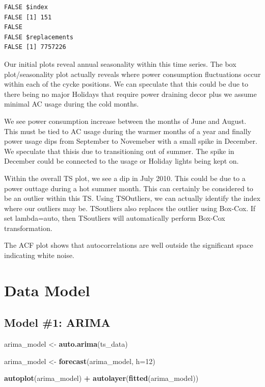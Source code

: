 \documentclass[openany]{book}
\newenvironment{Shaded}{\begin{snugshade}}{\end{snugshade}}
\newcommand{\KeywordTok}[1]{\textcolor[rgb]{0.13,0.29,0.53}{\textbf{#1}}}
\newcommand{\DataTypeTok}[1]{\textcolor[rgb]{0.13,0.29,0.53}{#1}}
\newcommand{\DecValTok}[1]{\textcolor[rgb]{0.00,0.00,0.81}{#1}}
\newcommand{\StringTok}[1]{\textcolor[rgb]{0.31,0.60,0.02}{#1}}
\newcommand{\OperatorTok}[1]{\textcolor[rgb]{0.81,0.36,0.00}{\textbf{#1}}}
\newcommand{\NormalTok}[1]{#1}
\begin{document}
\begin{verbatim}
FALSE $index
FALSE [1] 151
FALSE 
FALSE $replacements
FALSE [1] 7757226
\end{verbatim}

Our initial plots reveal annual seasonality within this time series. The
box plot/seasonality plot actually reveals where power consumption
fluctuations occur within each of the cycke positions. We can speculate
that this could be due to there being no major Holidays that require
power draining decor plus we assume minimal AC usage during the cold
months.

We see power consumption increase between the months of June and August.
This must be tied to AC usage during the warmer months of a year and
finally power usage dips from September to Novemeber with a small spike
in December. We speculate that thisis due to transitioning out of
summer. The spike in December could be connected to the usage or Holiday
lights being kept on.

Within the overall TS plot, we see a dip in July 2010. This could be due
to a power outtage during a hot summer month. This can certainly be
considered to be an outlier within this TS. Using TSOutliers, we can
actually identify the index where our outliers may be. TSoutliers also
replaces the outlier using Box-Cox. If set lambda=auto, then TSoutliers
will automatically perform Box-Cox transformation.

The ACF plot shows that autocorrelations are well outside the
significant space indicating white noise.

\section*{Data Model}\label{b-model}

\subsection{Model \#1: ARIMA}\label{model-1-arima}

\begin{Shaded}
\begin{Highlighting}[]
\NormalTok{arima_model <-}\StringTok{ }\KeywordTok{auto.arima}\NormalTok{(ts_data)}

\NormalTok{arima_model <-}\StringTok{ }\KeywordTok{forecast}\NormalTok{(arima_model, }\DataTypeTok{h=}\DecValTok{12}\NormalTok{)}

\KeywordTok{autoplot}\NormalTok{(arima_model) }\OperatorTok{+}\StringTok{ }\KeywordTok{autolayer}\NormalTok{(}\KeywordTok{fitted}\NormalTok{(arima_model))}
\end{Highlighting}
\end{Shaded}
\end{document}
